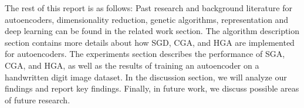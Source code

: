 The rest of this report is as follows: Past research and background literature for autoencoders, dimensionality reduction, genetic algorithms, representation and deep learning can be found in the related work section. The algorithm description section contains more details about how SGD, CGA, and HGA are implemented for autoencoders. The experiments section describes the performance of SGA, CGA, and HGA, as well as the results of training an autoencoder on a handwritten digit image dataset. In the discussion section, we will analyze our findings and report key findings. Finally, in future work, we discuss possible areas of future research.  




